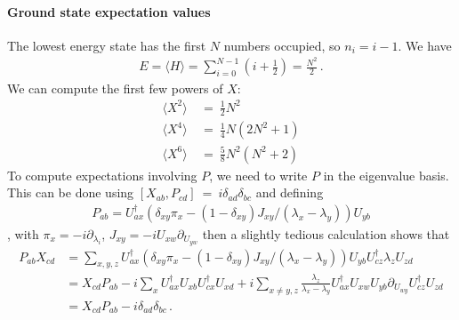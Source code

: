 \documentclass[a4paper,11pt]{article}
\numberwithin{equation}{section}
\begin{document}
\paragraph{Ground state expectation values} The lowest energy state has the first $N$ numbers occupied, so $n_i = i - 1$. We have 
%
\begin{align}
    E = \langle H \rangle = \sum_{i = 0}^{N-1}\left( i + \frac{1}{2} \right) = \frac{N^2}{2} \, .
\end{align}
%
We can compute the first few powers of $X$:
%
\begin{align}
    \langle X^2 \rangle \ &= \ \frac{1}{2}N^2 \\
    \langle X^4 \rangle \ &= \ \frac{1}{4}N(2N^2 + 1) \\
    \langle X^6 \rangle \ &= \ \frac{5}{8}N^2(N^2 + 2)
\end{align}
%
To compute expectations involving $P$, we need to write $P$ in the eigenvalue basis. This can be done using $[X_{ab}, P_{cd}] \ = \ i \delta_{ad} \delta_{bc}$ and defining 
%
\begin{align}
    P_{ab} = U^\dagger_{ax} (\delta_{xy} \pi_x - (1 - \delta_{xy}) J_{xy} / (\lambda_x - \lambda_y) ) U_{yb}
\end{align}
%
, with $\pi_x = -i \partial_{\lambda_i}$, $J_{xy} = -i U_{xw} \partial_{U_{yw}}$ 
%
then a slightly tedious calculation shows that 
%
\begin{align}
     P_{ab} X_{cd} &=  \sum_{x,y,z} U^\dagger_{ax} (\delta_{xy} \pi_x - (1 - \delta_{xy})J_{xy} / (\lambda_x - \lambda_y) ) U_{yb} U^\dagger_{cz} \lambda_z  U_{zd} \\
     &= X_{cd} P_{ab}
     -i \sum_x U^\dagger_{ax}  U_{xb} U^\dagger_{cx}  U_{xd} 
     + i \sum_{x \neq y,z} \frac{\lambda_z}{\lambda_x - \lambda_y} U^\dagger_{ax} U_{xw} U_{yb} \partial_{U_{wy}} U^\dagger_{cz} U_{zd} \\
    &= X_{cd} P_{ab} - i  \delta_{ad} \delta_{bc} \, . 
\end{align}
\end{document}
